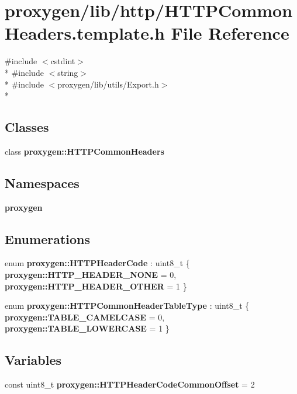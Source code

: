 \section{proxygen/lib/http/\+H\+T\+T\+P\+Common\+Headers.template.\+h File Reference}
\label{HTTPCommonHeaders_8template_8h}
{\ttfamily \#include $<$cstdint$>$}\\*
{\ttfamily \#include $<$string$>$}\\*
{\ttfamily \#include $<$proxygen/lib/utils/\+Export.\+h$>$}\\*
\subsection*{Classes}
\begin{DoxyCompactItemize}
\item 
class {\bf proxygen\+::\+H\+T\+T\+P\+Common\+Headers}
\end{DoxyCompactItemize}
\subsection*{Namespaces}
\begin{DoxyCompactItemize}
\item 
 {\bf proxygen}
\end{DoxyCompactItemize}
\subsection*{Enumerations}
\begin{DoxyCompactItemize}
\item 
enum {\bf proxygen\+::\+H\+T\+T\+P\+Header\+Code} \+: uint8\+\_\+t \{ {\bf proxygen\+::\+H\+T\+T\+P\+\_\+\+H\+E\+A\+D\+E\+R\+\_\+\+N\+O\+NE} = 0, 
{\bf proxygen\+::\+H\+T\+T\+P\+\_\+\+H\+E\+A\+D\+E\+R\+\_\+\+O\+T\+H\+ER} = 1
 \}
\item 
enum {\bf proxygen\+::\+H\+T\+T\+P\+Common\+Header\+Table\+Type} \+: uint8\+\_\+t \{ {\bf proxygen\+::\+T\+A\+B\+L\+E\+\_\+\+C\+A\+M\+E\+L\+C\+A\+SE} = 0, 
{\bf proxygen\+::\+T\+A\+B\+L\+E\+\_\+\+L\+O\+W\+E\+R\+C\+A\+SE} = 1
 \}
\end{DoxyCompactItemize}
\subsection*{Variables}
\begin{DoxyCompactItemize}
\item 
const uint8\+\_\+t {\bf proxygen\+::\+H\+T\+T\+P\+Header\+Code\+Common\+Offset} = 2
\end{DoxyCompactItemize}
